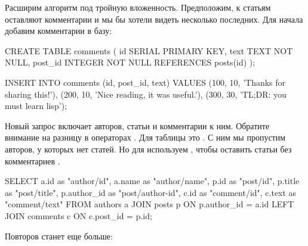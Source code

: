 Расширим алгоритм под тройную вложенность. Предположим, к статьям оставляют комментарии и мы бы хотели видеть несколько последних. Для начала добавим комментарии в базу:

\begin{english}
  \begin{sql}
CREATE TABLE comments (
  id SERIAL PRIMARY KEY,
  text TEXT NOT NULL,
  post_id INTEGER NOT NULL REFERENCES posts(id)
);

INSERT INTO comments (id, post_id, text) VALUES
  (100, 10, 'Thanks for sharing this!'),
  (200, 10, 'Nice reading, it was useful.'),
  (300, 30, 'TL;DR: you must learn lisp');
  \end{sql}
\end{english}

Новый запрос включает авторов, статьи и комментарии к ним. Обратите внимание на разницу в операторах . Для таблицы  это  . С ним мы пропустим авторов, у которых нет статей. Но для  используем , чтобы оставить статьи без комментариев .

\begin{english}
  \begin{sql/lines}
SELECT
  a.id        as "author/id",
  a.name      as "author/name",
  p.id        as "post/id",
  p.title     as "post/title",
  p.author_id as "post/author-id",
  c.id        as "comment/id",
  c.text      as "comment/text"
FROM authors a
JOIN posts p ON p.author_id = a.id
LEFT JOIN comments c ON c.post_id = p.id;
  \end{sql/lines}
\end{english}

Повторов станет еще больше:


